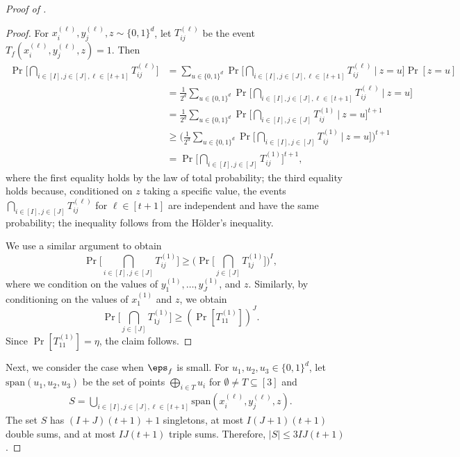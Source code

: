 \documentclass[11pt]{article}
\numberwithin{equation}{section}
\theoremstyle{definition}
\theoremstyle{plain}
\begin{document}
\begin{proof}[Proof of ]
\begin{proof}
    
    For $x_i^{(\ell)}, y_j^{(\ell)}, z \sim \{0,1\}^d$, let $T_{ij}^{(\ell)}$ be the event $T_f(x_i^{(\ell)}, y_j^{(\ell)}, z) = 1$. Then
    \begin{align*}
          \Pr\Big[ \bigcap_{i \in [I], j \in [J],  \ell \in [t+1]} T_{ij}^{(\ell)}\Big] &= \sum_{u \in \{0,1\}^d}     \Pr\Big[  \bigcap_{i \in [I], j \in [J],  \ell \in [t+1]} T_{ij}^{(\ell)} \:|\:  z = u\Big]\Pr[ z = u] \\
          &= \frac{1}{2^{d}}\sum_{u \in \{0,1\}^d}     \Pr\Big[  \bigcap_{i \in [I], j \in [J],  \ell \in [t+1]} T_{ij}^{(\ell)} \:|\: z=u\Big] \\
          &= \frac{1}{2^{d}}\sum_{u \in \{0,1\}^d}     \Pr\Big[ \bigcap_{i \in [I], j \in [J]} T_{ij}^{(1)} \:|\:z = u\Big]^{t+1} \\
          &\geq \Big( \frac{1}{2^{d}} \sum_{u \in \{0,1\}^d}     \Pr\Big[ \bigcap_{i \in [I], j \in [J]} T_{ij}^{(1)} \:|\:z = u\Big] \Big)^{t+1} \\
          &= \Pr\biggl[ \bigcap_{ i \in [I], j \in [J]} T_{ij}^{(1)}\biggr]^{t+1},
    \end{align*}
    where the first equality holds by the law of total probability; the third equality holds because, conditioned on $z$ taking a specific value,  the events $\bigcap_{i \in [I],j\in[J]}T_{ij}^{(\ell)}$ for $\ell\in[t+1]$ are independent and have the same probability; the inequality follows from the H\"{o}lder's inequality. 
    
    We use a similar argument to obtain
    \begin{equation*}
        \Pr\Big[ \bigcap_{ i \in [I], j \in [J]} T_{ij}^{(1)}\Big] \geq \Big(\Pr\Big[ \bigcap_{ j \in [J]} T_{1j}^{(1)}\Big]\Big)^{I},
    \end{equation*}
    where we condition on the values of $y_1^{(1)}, \dots, y_J^{(1)}$, and $z$. Similarly, by conditioning on the values of $x_1^{(1)}$ and $z$, we obtain
     \begin{equation*}
        \Pr\Big[ \bigcap_{ j \in [J]} T_{1j}^{(1)}\Big] \geq (\Pr[T_{11}^{(1)}])^{J}.
    \end{equation*}
    Since $\Pr[T_{11}^{(1)}] = \eta$, the claim follows. 
\end{proof}


Next, we consider the case when $\eps_f$ is small. For $u_1, u_2, u_3 \in \{0,1\}^d$, let $\mathrm{span}(u_1, u_2, u_3)$ be the set of points $\bigoplus_{i \in T} u_i$ for $ \emptyset \neq T \subseteq [3]$ and 
 \begin{align*}
      S = \bigcup_{i \in [I], j\in [J], \ell \in [t+1]} \mathrm{span}(x_i^{(\ell)}, y_j^{(\ell)}, z) .
 \end{align*}
 The set $S$ has $(I+J)(t+1)+1$ singletons, at most $I(J+1)(t+1)$ double sums, and at most $IJ(t+1)$ triple sums. Therefore, $|S| \leq 3IJ(t+1)$.  
 

\end{proof}
\end{document}
